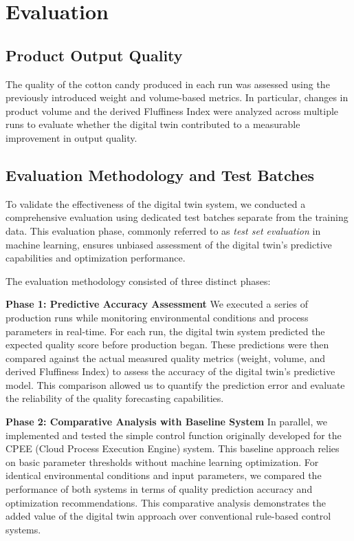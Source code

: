 \chapter{Evaluation}
\label{sec:evaluation}

\section{Product Output Quality}


The quality of the cotton candy produced in each run was assessed using the previously introduced weight and volume-based metrics. In particular, changes in product volume and the derived Fluffiness Index were analyzed across multiple runs to evaluate whether the digital twin contributed to a measurable improvement in output quality.

\section{Evaluation Methodology and Test Batches}

To validate the effectiveness of the digital twin system, we conducted a comprehensive evaluation using dedicated test batches separate from the training data. This evaluation phase, commonly referred to as \textit{test set evaluation} in machine learning, ensures unbiased assessment of the digital twin's predictive capabilities and optimization performance.

The evaluation methodology consisted of three distinct phases:

\textbf{Phase 1: Predictive Accuracy Assessment}
We executed a series of production runs while monitoring environmental conditions and process parameters in real-time. For each run, the digital twin system predicted the expected quality score before production began. These predictions were then compared against the actual measured quality metrics (weight, volume, and derived Fluffiness Index) to assess the accuracy of the digital twin's predictive model. This comparison allowed us to quantify the prediction error and evaluate the reliability of the quality forecasting capabilities.

\textbf{Phase 2: Comparative Analysis with Baseline System}
In parallel, we implemented and tested the simple control function originally developed for the CPEE (Cloud Process Execution Engine) system. This baseline approach relies on basic parameter thresholds without machine learning optimization. For identical environmental conditions and input parameters, we compared the performance of both systems in terms of quality prediction accuracy and optimization recommendations. This comparative analysis demonstrates the added value of the digital twin approach over conventional rule-based control systems.

